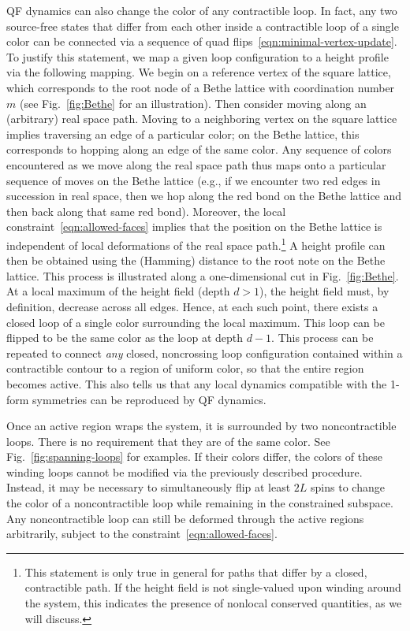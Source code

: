 QF dynamics can also change the color of any contractible loop.
In fact, any two source-free states that differ from each other inside a contractible loop of a single color can be connected via a sequence of quad flips~\eqref{eqn:minimal-vertex-update}. 
 To justify this statement, we map a given loop configuration to a height profile via the following mapping. We begin on a reference vertex of the square lattice, which corresponds to the root node of a Bethe lattice with coordination number $m$ (see Fig.~\ref{fig:Bethe} for an illustration). Then consider moving along an (arbitrary) real space path. Moving to a neighboring vertex on the square lattice implies traversing an edge of a particular color; on the Bethe lattice, this corresponds to hopping along an edge of the same color. Any sequence of colors encountered as we move along the real space path thus maps onto a particular sequence of moves on the Bethe lattice (e.g., if we encounter two red edges in succession in real space, then we hop along the red bond on the Bethe lattice and then back along that same red bond). Moreover, the local constraint~\eqref{eqn:allowed-faces} implies that the position on the Bethe lattice is independent of local deformations of the real space path.\footnote{This statement is only true in general for paths that differ by a closed, contractible path. If the height field  is not single-valued upon winding around the system, this indicates the presence of nonlocal conserved quantities, as we will discuss.} A height profile can then be obtained using the (Hamming) distance to the root note on the Bethe lattice. This process is illustrated along a one-dimensional cut in Fig.~\ref{fig:Bethe}. At a local maximum of the height field (depth $d>1$), the height field must, by definition, decrease across all edges. Hence, at each such point, there exists a closed loop of a single color surrounding the local maximum. This loop can be flipped to be the same color as the loop at depth $d-1$. This process can be repeated to connect \emph{any} closed, noncrossing loop configuration contained within a contractible contour to a region of uniform color, so that the entire region becomes active. This also tells us that any local dynamics compatible with the 1-form symmetries can be reproduced by QF dynamics.

Once an active region wraps the system, it is surrounded by two noncontractible loops. There is no requirement that they are of the same color. See Fig.~\ref{fig:spanning-loops} for examples. If their colors differ, the colors of these winding loops cannot be modified via the previously described procedure. Instead, it may be necessary to simultaneously flip at least $2L$ spins to change the color of a noncontractible loop while remaining in the  constrained subspace. Any noncontractible loop can still be deformed through the active regions arbitrarily, subject to the constraint~\eqref{eqn:allowed-faces}.

